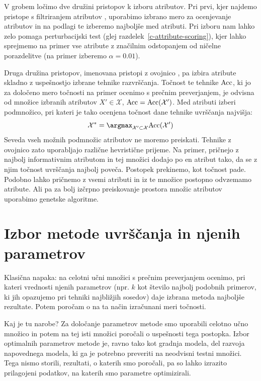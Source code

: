 V grobem ločimo dve družini pristopov k izboru atributov. Pri prvi, kjer najdemo pristope s filtriranjem atributov , uporabimo izbrano mero za ocenjevanje atributov in na podlagi te izberemo najboljše med atributi. Pri izboru nam lahko zelo pomaga perturbacijski test (glej razdelek~\ref{c-attribute-scoring}), kjer lahko sprejmemo na primer vse atribute z značilnim odstopanjem od ničelne porazdelitve (na primer izberemo $\alpha=0.01$).

Druga družina pristopov, imenovana pristopi z ovojnico , pa izbira atribute skladno z uspešnostjo izbrane tehnike razvrščanja. Točnost te tehnike ${\rm Acc}$, ki jo za določeno mero točnosti na primer ocenimo s prečnim preverjanjem, je odvisna od množice izbranih atributov $X'\in\mathcal{X}$, ${\rm Acc}={\rm Acc}(\mathcal{X}')$. Med atributi izberi podmnožico, pri kateri je tako ocenjena točnost dane tehnike uvrščanja najvišja:
%
$$ {\mathcal X}^* = \argmax_{{\mathcal X}'\subset{\mathcal X}}{\rm Acc}(\mathcal{X}') $$
%
Seveda vseh možnih podmnožic atributov ne moremo preiskati. Tehnike z ovojnico zato uporabljajo različne hevristične prijeme. Na primer, pričnejo z najbolj informativnim atributom in tej množici dodajo po en atribut tako, da se z njim točnost uvrščanja najbolj poveča. Postopek prekinemo, kot točnost pade. Podobno lahko pričnemo z vsemi atributi in iz te množice postopno odvzemamo atribute. Ali pa za bolj izčrpno preiskovanje prostora množic atributov uporabimo genetske algoritme.

\section{Izbor metode uvrščanja in njenih parametrov}

Klasična napaka: na celotni učni množici s prečnim preverjanjem ocenimo, pri kateri vrednosti njenih parametrov (npr. $k$ kot število najbolj podobnih primerov, ki jih opazujemo pri tehniki najbližjih sosedov) daje izbrana metoda najboljše rezultate. Potem poročam o na ta način izračunani meri točnosti.

Kaj je tu narobe? Za določanje parametrov metode smo uporabili celotno učno množico in potem na tej isti množici poročali o uspešnosti tega postopka. Izbor optimalnih parametrov metode je, ravno tako kot gradnja modela, del razvoja napovednega modela, ki ga je potrebno preveriti na neodvisni testni množici. Tega nismo storili, rezultati, o katerih smo poročali, pa so lahko izrazito prilagojeni podatkov, na katerih smo parametre optimizirali.

